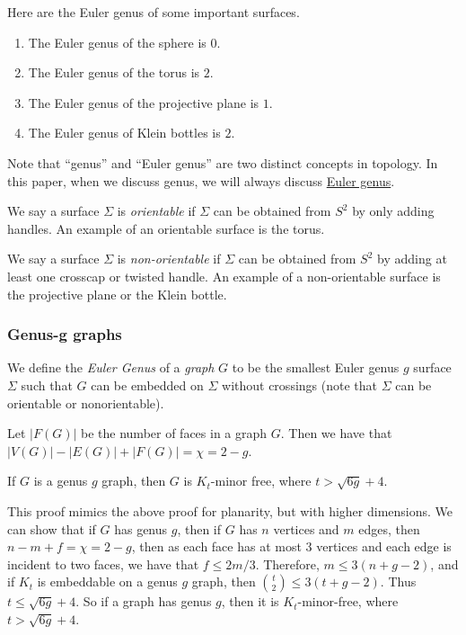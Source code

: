 \begin{example}
	Here are the Euler genus of some important surfaces.
	\begin{enumerate}
		\item The Euler genus of the sphere is $0$.
		\item The Euler genus of the torus is $2$.
		\item The Euler genus of the projective plane is $1$. 
		\item The Euler genus of Klein bottles is $2$. 
	\end{enumerate}
\end{example}

Note that ``genus'' and ``Euler genus'' are two distinct concepts in topology. In this paper, when we discuss genus, we will always discuss \underline{Euler genus}.

We say a surface $\Sigma$ is \textit{orientable} if $\Sigma$ can be obtained from $S^2$ by only adding handles. An example of an orientable surface is the torus.

We say a surface $\Sigma$ is \textit{non-orientable} if $\Sigma$ can be obtained from $S^2$ by adding at least one crosscap or twisted handle. An example of a non-orientable surface is the projective plane or the Klein bottle. 

\subsubsection{Genus-g graphs}\label{sssec:Graph_genus}

We define the \textit{Euler Genus} of a \textit{graph} $G$ to be the smallest Euler genus $g$ surface $\Sigma$ such that $G$ can be embedded on $\Sigma$ without crossings (note that $\Sigma$ can be orientable or nonorientable).

Let $|F(G)|$ be the number of faces in a graph $G$. Then we have that $|V(G)| - |E(G)| + |F(G)| = \chi = 2 - g$. 

\begin{theorem}\label{thm:bounded_genus_kt_free}
	If $G$ is a genus $g$ graph, then $G$ is $K_t$-minor free, where $t > \sqrt{6g} + 4$. 
\end{theorem}
This proof mimics the above proof for planarity, but with higher dimensions. 
We can show that if $G$ has genus $g$, then if $G$ has $n$ vertices and $m$ edges, then $n - m + f = \chi = 2-g$, then as each face has at most 3 vertices and each edge is incident to two faces, we have that $f \leq 2m/3$. Therefore, $m \leq 3(n + g - 2)$, and if $K_t$ is embeddable on a genus $g$ graph, then $\binom{t}{2} \leq 3 (t + g - 2)$. Thus $t \leq \sqrt{6g} + 4$. So if a graph has genus $g$, then it is $K_t$-minor-free, where $t > \sqrt{6g} + 4$. 

